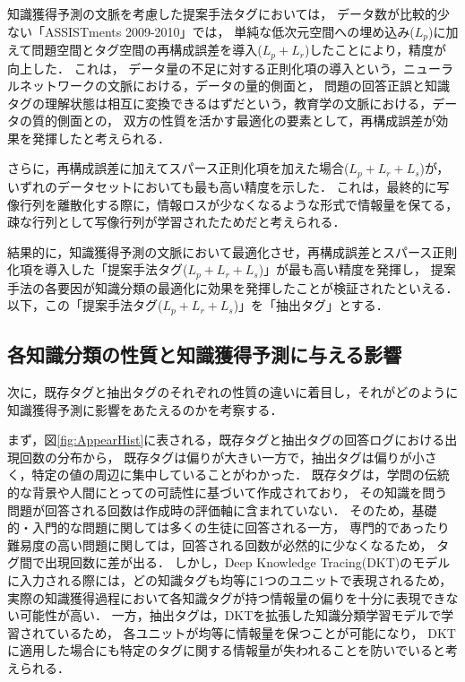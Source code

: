 知識獲得予測の文脈を考慮した提案手法タグにおいては，
データ数が比較的少ない「ASSISTments 2009-2010」では，
単純な低次元空間への埋め込み($L_p$)に加えて問題空間とタグ空間の再構成誤差を導入($L_p + L_r$)したことにより，精度が向上した．
これは，
データ量の不足に対する正則化項の導入という，ニューラルネットワークの文脈における，データの量的側面と，
問題の回答正誤と知識タグの理解状態は相互に変換できるはずだという，教育学の文脈における，データの質的側面との，
双方の性質を活かす最適化の要素として，再構成誤差が効果を発揮したと考えられる．

さらに，再構成誤差に加えてスパース正則化項を加えた場合($L_p + L_r + L_s$)が，いずれのデータセットにおいても最も高い精度を示した．
これは，最終的に写像行列を離散化する際に，情報ロスが少なくなるような形式で情報量を保てる，疎な行列として写像行列が学習されたためだと考えられる．


結果的に，知識獲得予測の文脈において最適化させ，再構成誤差とスパース正則化項を導入した「提案手法タグ($L_p + L_r + L_s$)」が最も高い精度を発揮し，
提案手法の各要因が知識分類の最適化に効果を発揮したことが検証されたといえる．
以下，この「提案手法タグ($L_p + L_r + L_s$)」を「抽出タグ」とする．


\subsection{各知識分類の性質と知識獲得予測に与える影響}
次に，既存タグと抽出タグのそれぞれの性質の違いに着目し，それがどのように知識獲得予測に影響をあたえるのかを考察する．

まず，図\ref{fig:AppearHist}に表される，既存タグと抽出タグの回答ログにおける出現回数の分布から，
既存タグは偏りが大きい一方で，抽出タグは偏りが小さく，特定の値の周辺に集中していることがわかった．
既存タグは，学問の伝統的な背景や人間にとっての可読性に基づいて作成されており，
その知識を問う問題が回答される回数は作成時の評価軸に含まれていない．
そのため，基礎的・入門的な問題に関しては多くの生徒に回答される一方，
専門的であったり難易度の高い問題に関しては，回答される回数が必然的に少なくなるため，
タグ間で出現回数に差が出る．
しかし，Deep Knowledge Tracing(DKT)のモデルに入力される際には，どの知識タグも均等に1つのユニットで表現されるため，
実際の知識獲得過程において各知識タグが持つ情報量の偏りを十分に表現できない可能性が高い．
一方，抽出タグは，DKTを拡張した知識分類学習モデルで学習されているため，
各ユニットが均等に情報量を保つことが可能になり，
DKTに適用した場合にも特定のタグに関する情報量が失われることを防いでいると考えられる．

